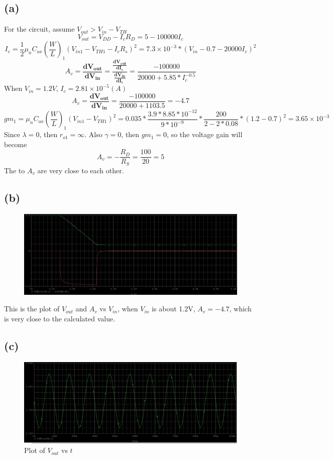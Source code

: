 \documentclass[12pt]{article}
\begin{document}
\subsection{(a)}
For the circuit, assume $V_{out}>V_{in}-V_{TH}$
$$V_{out}=V_{DD}-I_cR_D=5-100000I_c$$
$$I_c=\frac{1}{2}\mu_nC_{ox}(\frac{W}{L})_1(V_{in1}-V_{TH1}-I_cR_s)^2=7.3\times10^{-3}*(V_{in}-0.7-20000I_c)^2$$
$$A_v=\mathbf{\frac{dV_{out}}{dV_{in}}}=\mathbf{\frac{\frac{dV_{out}}{dI_c}}{\frac{dV_{in}}{dI_c}}}=\frac{-100000}{20000+5.85*I_c^{-0.5}}$$
When $V_{in}=1.2V$, $I_c=2.81\times10^{-5}(A)$
$$A_v=\mathbf{\frac{dV_{out}}{dV_{in}}}=\frac{-100000}{20000+1103.5}=-4.7$$
$$gm_1=\mu_nC_{ox}(\frac{W}{L})_1(V_{in1}-V_{TH1})^2=0.035*\frac{3.9*8.85*10^{-12}}{9*10^{-9}}*\frac{200}{2-2*0.08}*(1.2-0.7)^2=3.65\times10^{-3}$$
Since $\lambda=0$, then $r_{o1}=\infty$. Also $\gamma=0$, then $gm_1=0$, so the voltage gain will become 
$$A_v=-\frac{R_{D}}{R_{S}}=\frac{100}{20}=5$$
The to $A_v$ are very close to each other.
\subsection{(b)}
\begin{figure}[H]
\centering
\includegraphics[scale=0.25]{P5.png}
\end{figure}
This is the plot of $V_{out}$ and $A_v$ vs $V_{in}$, when $V_{in}$ is about 1.2V, $A_v=-4.7$, which is very close to the calculated value.
\subsection{(c)}
\begin{figure}[H]
\centering
\includegraphics[scale=0.25]{P6.png}
\caption{Plot of $V_{out}$ vs $t$}
\end{figure}
\end{document}
